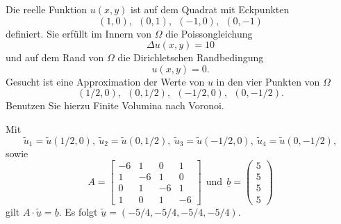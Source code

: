 Die reelle Funktion $u(x,y)$ ist auf dem Quadrat mit Eckpunkten
\[
(1,0), \ \  (0,1), \ \ (-1,0), \ \  (0,-1)
\]
definiert. Sie erfüllt im Innern von $\Omega$ die Poissongleichung
\[\Delta u(x,y) = 10
\]
und auf dem Rand von $\Omega$ die Dirichletschen Randbedingung
\[
u(x,y) = 0.
\]
Gesucht ist eine Approximation der Werte von $u$ in den vier Punkten von $\Omega$
\[
(1/2,0), \ \  (0,1/2), \ \ (-1/2,0), \ \  (0,-1/2).
\]
Benutzen Sie hierzu Finite Volumina nach Voronoi.  

\begin{loesung}
Mit
\[
\tilde u_1 = \tilde u(1/2,0), \ \tilde u_2 = \tilde u(0,1/2), \ \tilde u_3 = \tilde u(-1/2,0), \ \tilde u_4 = \tilde u(0,-1/2),
\]
sowie
\[
A = \left[\begin{array}{rrrr} -6 & 1 & 0 & 1 \\ 1 & -6 & 1 & 0 \\ 0 & 1 & -6 & 1 \\ 1 & 0 & 1 & -6  \end{array}\right] \ \ \text{und} \ \
  \underline{b} =  \left(\begin{array}{r} 5 \\ 5 \\ 5 \\ 5 \end{array}\right)
\]
gilt
$A \cdot \underline{\tilde u} = \underline{b}.$
Es folgt $\underline{\tilde u} = (-5/4, -5/4, -5/4, -5/4).$
\end{loesung}

